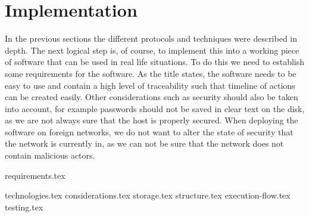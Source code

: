 \documentclass{article}
\begin{document}
\section{Implementation}
\label{sec:implementation}
In the previous sections the different protocols and techniques were described in depth. The next logical step is, of course, to implement this into a working piece of software that can be used in real life situations. To do this we need to establish some requirements for the software. As the title states, the software needs to be easy to use and contain a high level of traceability such that timeline of actions can be created easily. Other considerations such as security should also be taken into account, for example passwords should not be saved in clear text on the disk, as we are not always sure that the host is properly secured. When deploying the software on foreign networks, we do not want to alter the state of security that the network is currently in, as we can not be sure that the network does not contain malicious actors.

{requirements.tex}

{technologies.tex}
{considerations.tex}
{storage.tex}
{structure.tex}
{execution-flow.tex}
{testing.tex}
\end{document}
